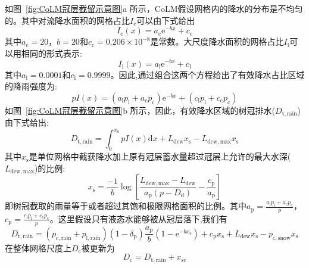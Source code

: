 如图~\ref{fig:CoLM冠层截留示意图}a 所示，CoLM假设网格内的降水的分布是不均匀的。其中对流降水面积的网格占比$I_{\mathrm {c}} $可以由下式给出
\begin{equation}
  I_{\mathrm{c}}(x)=a_{\mathrm{c}} {\mathrm e}^{-bx}+c_{\mathrm{c}}
\end{equation}
其中$a_{\mathrm {c}} =20$，$b=20$和$c_{\mathrm {c}} =0.206\times10^{-8}$是常数。大尺度降水面积的网格占比$I_{\mathrm {l}} $可以用相同的形式表示:
\begin{equation}
  I_{\mathrm{l}}(x)=a_{\mathrm{l}} {\mathrm e}^{-b x}+c_{\mathrm{l}}
\end{equation}
其中$a_{\mathrm {l}} =0.0001$和$c_{\mathrm {l}} =0.9999$。因此,通过组合这两个方程给出了有效降水占比区域的降雨强度为:
\begin{equation}
  p I(x)=\left(a_{\mathrm{l}} p_{\mathrm{l}}+a_{\mathrm{c}} p_{\mathrm{c}}\right) {\mathrm e}^{-b x}+\left(c_{\mathrm{l}} p_{\mathrm{l}}+c_{\mathrm{c}} p_{\mathrm{c}}\right)
\end{equation}
如图~\ref{fig:CoLM冠层截留示意图}b 所示，因此，有效降水区域的树冠排水($D_{\mathrm {t,rain}}$)由下式给出:
\begin{equation}
  D_{\mathrm {t,rain}}=\int_{0}^{x_{\mathrm{s}}} p I(x){\mathrm { d}} x+L_{\mathrm{dew}} x_{\mathrm{s}}-L_{\mathrm {dew,max}} x_{\mathrm{s}}
\end{equation}
其中$x_{\mathrm {s}} $是单位网格中截获降水加上原有冠层蓄水量超过冠层上允许的最大水深($L_{\mathrm {dew,max}}$)的比例:
\begin{equation}
  x_{\mathrm{s}}=\frac{-1}{b} \log \left[\frac{L_{\mathrm {dew,max}}-L_{\mathrm{dew}}}{a_{\mathrm{p}}\left(p-D_{\mathrm{d}}\right)}-\frac{c_{\mathrm{p}}}{a_{\mathrm{p}}}\right]
\end{equation}
即树冠截取的雨量等于或者超过其饱和极限网格面积的比例。其中$a_{\mathrm {p}} =\frac{a_{\mathrm {l}}p_{\mathrm {l}} +a_{\mathrm {c}}p_{\mathrm {c}} }{p}$，$c_{\mathrm {p}} =\frac{c_{\mathrm {l}}p_{\mathrm {l}} +c_{\mathrm {c}}p_{\mathrm {c}} }{p}$。这里假设只有液态水能够被从冠层落下,我们有
\begin{equation}
  D_{\mathrm {t,rain}}=\left(p_{\mathrm{c,rain}}+p_{\mathrm{l,rain}}\right)\left(1-\delta_{\mathrm{p}}\right) \frac{a_{\mathrm{p}}}{b}\left(1-{\mathrm e}^{-b x_{\mathrm{s}}}\right)+c_{\mathrm{p}} x_{\mathrm{s}}+L_{\mathrm{dew}} x_{\mathrm{s}}-p_{\mathrm{c,snow}} x_{\mathrm{s}}
\end{equation}
在整体网格尺度上$D_{\mathrm {c}} $被更新为
\begin{equation}
  D_{\mathrm {c}} =D_{\mathrm {t,r a i n}}+x_{\mathrm{s c}}
\end{equation}
